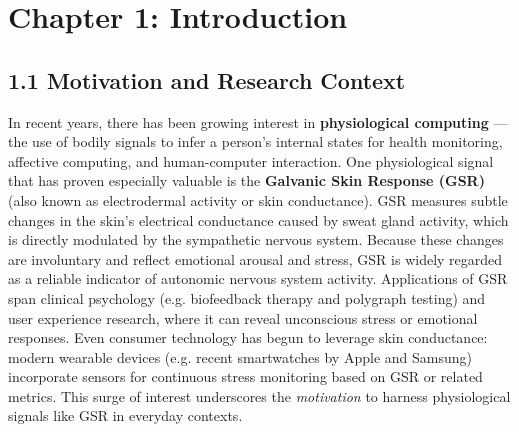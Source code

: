 \label{chap:1}

\chapter{Chapter 1: Introduction}

\section{1.1 Motivation and Research Context}

In recent years, there has been growing interest in \textbf{physiological
computing} --- the use of bodily signals to infer a person's internal
states for health monitoring, affective computing, and human-computer
interaction. One physiological signal that has proven especially
valuable is the \textbf{Galvanic Skin Response (GSR)} (also known as
electrodermal activity or skin conductance). GSR measures subtle changes
in the skin's electrical conductance caused by sweat gland activity,
which is directly modulated by the sympathetic nervous
system\cite{ref1}.
Because these changes are involuntary and reflect emotional arousal and
stress, GSR is widely regarded as a reliable indicator of autonomic
nervous system
activity\cite{ref1}.
Applications of GSR span clinical psychology (e.g. biofeedback therapy
and polygraph testing) and user experience research, where it can reveal
unconscious stress or emotional responses. Even consumer technology has
begun to leverage skin conductance: modern wearable devices (e.g. recent
smartwatches by Apple and Samsung) incorporate sensors for continuous
stress monitoring based on GSR or related
metrics\cite{ref2}\cite{ref3}.
This surge of interest underscores the \textit{motivation} to harness
physiological signals like GSR in everyday contexts.

